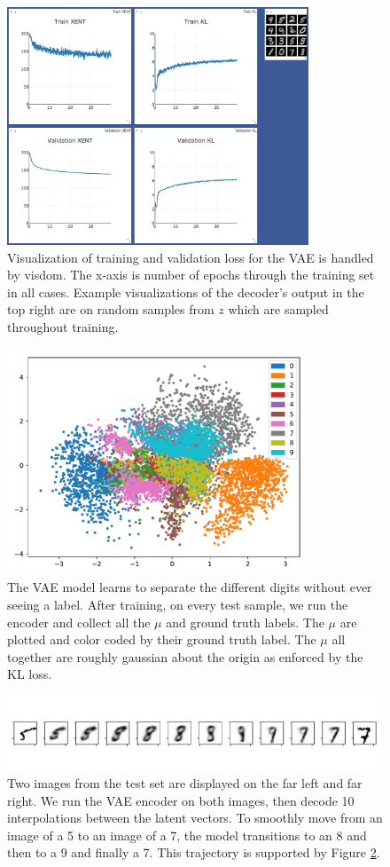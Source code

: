\documentclass[11pt]{article}
\begin{document}
 \begin{figure}
  \centering
  \includegraphics[width=9cm]{imgs/vae-train}
  \caption{\label{fig:loss} Visualization of training and validation loss for the VAE is handled by visdom. The x-axis is number of epochs through the training set in all cases. Example visualizations of the decoder's output in the top right are on random samples from $z$ which are sampled throughout training.}
\end{figure}

\begin{figure}
  \centering
  \includegraphics[width=9cm]{imgs/vae_mus2}
  \caption{The VAE model learns to separate the different digits without ever seeing a label. After training, on every test sample, we run the encoder and collect all the $\mu$ and ground truth labels. The $\mu$ are plotted and color coded by their ground truth label. The $\mu$ all together are roughly gaussian about the origin as enforced by the KL loss.}
  \label{fig:vaespace}
\end{figure}

\begin{figure}
  \centering
  \includegraphics[width=15cm]{imgs/interp_vae2}
  \caption{\label{fig:grid} Two images from the test set are displayed on the far left and far right. We run the VAE encoder on both images, then decode 10 interpolations between the latent vectors. To smoothly move from an image of a 5 to an image of a 7, the model transitions to an 8 and then to a 9 and finally a 7. This trajectory is supported by Figure \ref{fig:vaespace}.}
\end{figure}
\end{document}
